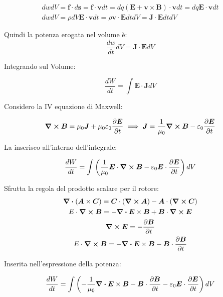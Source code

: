 \documentclass[a4paper]{scrarticle}
\begin{document}
\begin{gather*}
    dw dV = \bm f \cdot d\bm s = \bm f \cdot \bm v dt = dq (\bm E + \bm v\times \bm B )\cdot \bm v dt = dq \bm E \cdot \bm v dt\\
    dw dV = \rho dV \bm E \cdot \bm v dt = \rho \bm v \cdot \bm E dtdV = \bm J \cdot \bm E dtdV
\end{gather*}

Quindi la potenza erogata nel volume è:
\begin{equation}
    \frac{dw}{dt}dV = \bm J \cdot \bm E dV
\end{equation}

Integrando sul Volume:

\begin{equation*}
    \frac{dW}{dt}= \int \bm E \cdot \bm J dV
\end{equation*}

Considero la IV equazione di Maxwell:

\begin{equation*}
    \curl {\bm B} = \mu_0 \bm J + \mu_0\varepsilon_0 \pdv{\bm E}{t} \implies \bm J = \frac{1}{\mu_0} \curl {\bm B} - \varepsilon_0 \pdv{\bm E}{t}
\end{equation*}

La inserisco all'interno dell'integrale:

\begin{equation*}
    \frac{dW}{dt} = \int \left(\frac{1}{\mu_0} \bm E \cdot \curl{\bm B} - \varepsilon_0 \bm E \cdot \pdv{\bm E}{t} \right) dV
\end{equation*}

Sfrutta la regola del prodotto scalare per il rotore:
\begin{gather*}
    \div (\bm A \times \bm C) = \bm C \cdot (\curl{\bm A}) - \bm A \cdot (\curl{\bm C})\\
    E \cdot \curl{\bm B} = - \div{\bm E \times \bm B} + \bm B \cdot \curl{\bm E}\\
    \curl{\bm E} = - \pdv{\bm B}{t}\\
    E \cdot \curl{\bm B} = - \div{\bm E \times \bm B} - \bm B \cdot \pdv{\bm B}{t}
\end{gather*}

Inserita nell'espressione della potenza:

\begin{equation*}
    \frac{dW}{dt} = \int \left(- \frac{1}{\mu_0}\div{\bm E \times \bm B} - \bm B \cdot \pdv{\bm B}{t} - \varepsilon_0 \bm E \cdot \pdv{\bm E}{t}\right)dV
\end{equation*}
\end{document}
